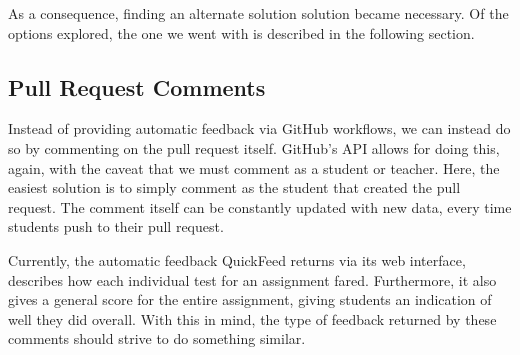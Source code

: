 As a consequence, finding an alternate solution solution became necessary.
Of the options explored, the one we went with is described in the following section.

\subsection{Pull Request Comments}

Instead of providing automatic feedback via GitHub workflows, we can instead do so by commenting on the pull request itself.
GitHub's API allows for doing this, again, with the caveat that we must comment as a student or teacher.
Here, the easiest solution is to simply comment as the student that created the pull request.
The comment itself can be constantly updated with new data, every time students push to their pull request.

Currently, the automatic feedback QuickFeed returns via its web interface, describes how each individual test for an assignment fared.
Furthermore, it also gives a general score for the entire assignment, giving students an indication of well they did overall.
With this in mind, the type of feedback returned by these comments should strive to do something similar.
